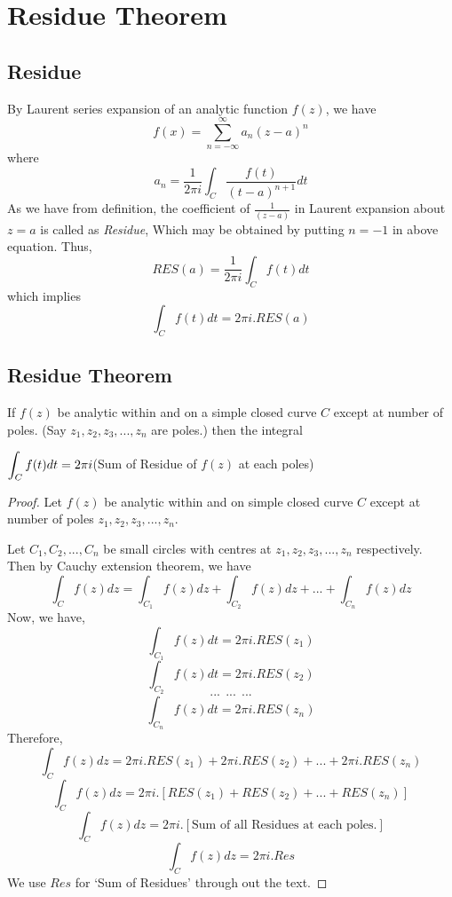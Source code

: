 \section{Residue Theorem}
\subsection{Residue}
 By Laurent series expansion of an analytic function $f(z)$, we have
 \[f(x) = \sum_{n=-\infty}^{\infty}  a_n(z-a)^n\]
 where \[a_n = \frac{1}{2\pi i} \int_C \frac{f(t)}{(t-a)^{n+1}} dt\]
As we have from definition, the coefficient of $\frac{1}{(z-a)}$ in Laurent expansion about $z=a$ is called as \emph{Residue}, Which may be obtained by putting $n=-1$ in above equation. Thus,
\[RES(a) =  \frac{1}{2\pi i} \int_C f(t) dt\]
which implies
\[\int_C f(t) dt = 2 \pi i .RES(a)\]
\subsection{Residue Theorem}
\begin{theorem}
If $f(z)$ be analytic within and on a simple closed curve $C$ except at number of poles. (Say $z_1, z_2, z_3, ..., z_n$ are poles.) then the integral
\begin{center}
$\displaystyle \int_C f(t) dt = 2 \pi i$(Sum of Residue of $f(z)$ at each poles)
\end{center}
\end{theorem}
\begin{proof}
Let $f(z)$ be analytic within and on simple closed curve $C$ except at number of poles $z_1, z_2, z_3, ..., z_n$.

Let $C_1, C_2, ..., C_n$ be small circles with centres at $z_1, z_2, z_3, ..., z_n$ respectively. Then by Cauchy extension theorem, we have
\[\int_C f(z) dz = \int_{C_1} f(z) dz + \int_{C_2} f(z) dz + ... + \int_{C_n} f(z) dz \] 
Now, we have,
\[\int_{C_1} f(z) dt = 2 \pi i .RES(z_1) \]
\[\int_{C_2} f(z) dt = 2 \pi i .RES(z_2) \]
\[... ~~...~~...\]
\[\int_{C_n} f(z) dt = 2 \pi i .RES(z_n)\]
Therefore, 
\[\int_C f(z) dz = 2 \pi i .RES(z_1) +2 \pi i .RES(z_2) +...+2 \pi i .RES(z_n)  \] 
\[\int_C f(z) dz = 2 \pi i .[RES(z_1) +RES(z_2) +...+RES(z_n)]  \] 
\[\int_C f(z) dz = 2 \pi i .[\textrm{Sum of all Residues at each poles.}]  \] 
\[\int_C f(z) dz = 2 \pi i .Res  \] 
We use $Res$ for `Sum of Residues' through out the text.  
\end{proof}
